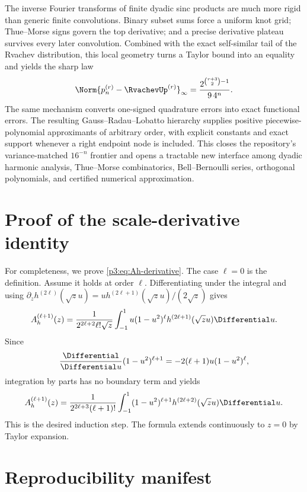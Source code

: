 \documentclass[11pt,oneside]{article}
\numberwithin{equation}{section}
\theoremstyle{definition}
\theoremstyle{remark}
\begin{document}
The inverse Fourier transforms of finite dyadic sinc products are much more rigid than
generic finite convolutions.  Binary subset sums force a uniform knot grid; Thue--Morse
signs govern the top derivative; and a precise derivative plateau survives every later
convolution.  Combined with the exact self-similar tail of the Rvachev distribution,
this local geometry turns a Taylor bound into an equality and yields the sharp law
\[
 \Norm{p_n^{(r)}-\RvachevUp^{(r)}}_\infty
 =\frac{2^{\binom{r+3}{2}-1}}{9\,4^n}.
\]
The same mechanism converts one-signed quadrature errors into exact functional errors.
The resulting Gauss--Radau--Lobatto hierarchy supplies positive piecewise-polynomial
approximants of arbitrary order, with explicit constants and exact support whenever a
right endpoint node is included.  This closes the repository's variance-matched
$16^{-n}$ frontier and opens a tractable new interface among dyadic harmonic analysis,
Thue--Morse combinatorics, Bell--Bernoulli series, orthogonal polynomials, and certified
numerical approximation.

\appendix

\section{Proof of the scale-derivative identity}
\label{p3:app:Ah}

For completeness, we prove \cref{p3:eq:Ah-derivative}.  The case $\ell=0$ is the
definition.  Assume it holds at order $\ell$.  Differentiating under the integral and
using $\partial_z h^{(2\ell)}(\sqrt z u)
=u h^{(2\ell+1)}(\sqrt z u)/(2\sqrt z)$ gives
\[
 A_h^{(\ell+1)}(z)
 =\frac{1}{2^{2\ell+2}\ell!\sqrt z}
 \int_{-1}^{1}u(1-u^2)^\ell h^{(2\ell+1)}(\sqrt z u)\Differential u.
\]
Since
\[
 \frac{\Differential}{\Differential u}(1-u^2)^{\ell+1}
 =-2(\ell+1)u(1-u^2)^\ell,
\]
integration by parts has no boundary term and yields
\[
 A_h^{(\ell+1)}(z)
 =\frac{1}{2^{2\ell+3}(\ell+1)!}
 \int_{-1}^{1}(1-u^2)^{\ell+1}h^{(2\ell+2)}(\sqrt z u)\Differential u.
\]
This is the desired induction step.  The formula extends continuously to $z=0$ by
Taylor expansion.

\section{Reproducibility manifest}
\label{p3:app:manifest}
\end{document}
